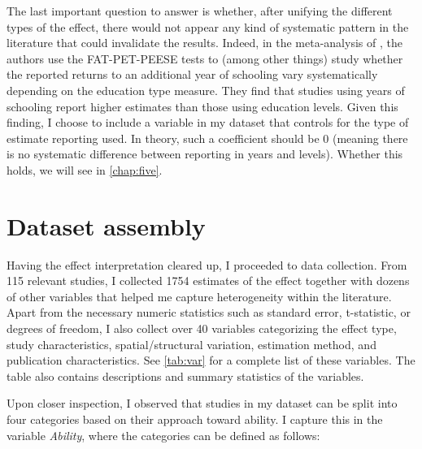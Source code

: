 The last important question to answer is whether, after unifying the different types of the effect, there would not appear any kind of systematic pattern in the literature that could invalidate the results. Indeed, in the meta-analysis of \cite{churchill2018meta}, the authors use the FAT-PET-PEESE tests to (among other things) study whether the reported returns to an additional year of schooling vary systematically depending on the education type measure. They find that studies using years of schooling report higher estimates than those using education levels. Given this finding, I choose to include a variable in my dataset that controls for the type of estimate reporting used. In theory, such a coefficient should be 0 (meaning there is no systematic difference between reporting in years and levels). Whether this holds, we will see in \autoref{chap:five}.

\section{Dataset assembly}
\label{sec:data_set}

Having the effect interpretation cleared up, I proceeded to data collection. From 115 relevant studies, I collected 1754 estimates of the effect together with dozens of other variables that helped me capture heterogeneity within the literature. Apart from the necessary numeric statistics such as standard error, t-statistic, or degrees of freedom, I also collect over 40 variables categorizing the effect type, study characteristics, spatial/structural variation, estimation method, and publication characteristics. See \autoref{tab:var} for a complete list of these variables. The table also contains descriptions and summary statistics of the variables.

Upon closer inspection, I observed that studies in my dataset can be split into four categories based on their approach toward ability. I capture this in the variable \textit{Ability}, where the categories can be defined as follows:

